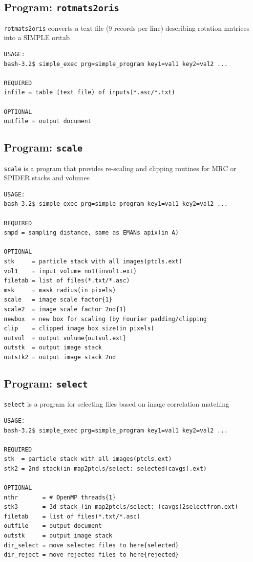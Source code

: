 \documentclass[a4paper,11pt]{article}
\newcommand{\prgname}[1]{\textcolor{NavyBlue}{\texttt{#1}}}
\begin{document}
\subsection{Program: \prgname{rotmats2oris}}
\label{rotmats2oris}
\prgname{rotmats2oris} converts a text file (9 records per line) describing rotation matrices into a SIMPLE oritab

\begin{verbatim}
USAGE:
bash-3.2$ simple_exec prg=simple_program key1=val1 key2=val2 ...

REQUIRED
infile = table (text file) of inputs(*.asc/*.txt)

OPTIONAL
outfile = output document
\end{verbatim}

\subsection{Program: \prgname{scale}}
\label{scale}
\prgname{scale} is a program that provides re-scaling and clipping routines for MRC or SPIDER stacks and volumes

\begin{verbatim}
USAGE:
bash-3.2$ simple_exec prg=simple_program key1=val1 key2=val2 ...

REQUIRED
smpd = sampling distance, same as EMANs apix(in A)

OPTIONAL
stk     = particle stack with all images(ptcls.ext)
vol1    = input volume no1(invol1.ext)
filetab = list of files(*.txt/*.asc)
msk     = mask radius(in pixels)
scale   = image scale factor{1}
scale2  = image scale factor 2nd{1}
newbox  = new box for scaling (by Fourier padding/clipping
clip    = clipped image box size(in pixels)
outvol  = output volume{outvol.ext}
outstk  = output image stack
outstk2 = output image stack 2nd
\end{verbatim}

\subsection{Program: \prgname{select}}
\label{select}
\prgname{select} is a program for selecting files based on image correlation matching

\begin{verbatim}
USAGE:
bash-3.2$ simple_exec prg=simple_program key1=val1 key2=val2 ...

REQUIRED
stk  = particle stack with all images(ptcls.ext)
stk2 = 2nd stack(in map2ptcls/select: selected(cavgs).ext)

OPTIONAL
nthr       = # OpenMP threads{1}
stk3       = 3d stack (in map2ptcls/select: (cavgs)2selectfrom.ext)
filetab    = list of files(*.txt/*.asc)
outfile    = output document
outstk     = output image stack
dir_select = move selected files to here{selected}
dir_reject = move rejected files to here{rejected}
\end{verbatim}
\end{document}
